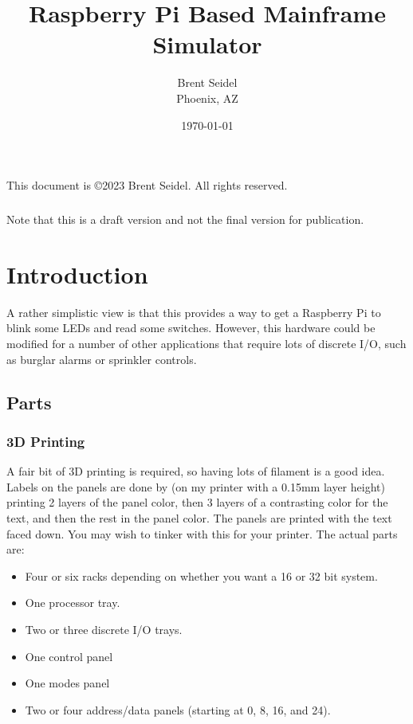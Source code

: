 \documentclass[10pt, openany]{book}
\title{Raspberry Pi Based Mainframe Simulator}
\author{Brent Seidel \\ Phoenix, AZ}
\date{ \today }
\begin{document}
%
%
\frontmatter
\maketitle
\begin{center}
This document is \copyright 2023 Brent Seidel.  All rights reserved.

\paragraph{}Note that this is a draft version and not the final version for publication.
\end{center}
\tableofcontents
\listoffigures
\listoftables

\mainmatter
\chapter{Introduction}
A rather simplistic view is that this provides a way to get a Raspberry Pi to blink some LEDs and read some switches.  However, this hardware could be modified for a number of other applications that require lots of discrete I/O, such as burglar alarms or sprinkler controls.

\section{Parts}
\subsection{3D Printing}
A fair bit of 3D printing is required, so having lots of filament is a good idea.  Labels on the panels are done by (on my printer with a 0.15mm layer height) printing 2 layers of the panel color, then 3 layers of a contrasting color for the text, and then the rest in the panel color.  The panels are printed with the text faced down.  You may wish to tinker with this for your printer.  The actual parts are:
\begin{itemize}
  \item Four or six racks depending on whether you want a 16 or 32 bit system.
  \item One processor tray.
  \item Two or three discrete I/O trays.
  \item One control panel
  \item One modes panel
  \item Two or four address/data panels (starting at 0, 8, 16, and 24).
\end{itemize}
\end{document}
